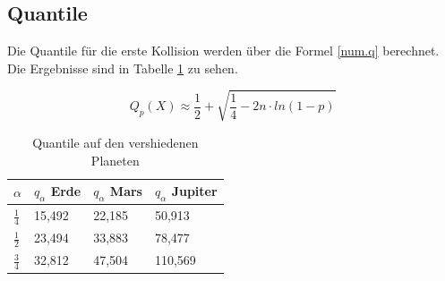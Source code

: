 \documentclass[../main.tex]{subfiles}
\begin{document}
    \subsection{Quantile}

    Die Quantile für die erste Kollision werden über die Formel \ref{num.q} berechnet. Die Ergebnisse sind in Tabelle \ref{table:quantile} zu sehen.

    \begin{equation}
        Q_{ p }(X) \approx \frac{ 1 }{ 2 } + \sqrt{ \frac{ 1 }{ 4 } - 2n\cdot ln(1-p)}
        \label{num.q}
    \end{equation}

    \begin{table}[h]
        \centering
        \begin{tabular}{|l|l|l|l|}
            \hline
            $\alpha$      & $q_{\alpha}$ Erde & $q_{\alpha}$ Mars & $q_{\alpha}$ Jupiter \\ \hline
            $\frac{1}{4}$ & 15,492            & 22,185            & 50,913               \\
            $\frac{1}{2}$ & 23,494            & 33,883            & 78,477               \\
            $\frac{3}{4}$ & 32,812            & 47,504            & 110,569              \\ \hline
        \end{tabular}
        \caption{\label{table:quantile} Quantile auf den vershiedenen Planeten}
    \end{table}
\end{document}
